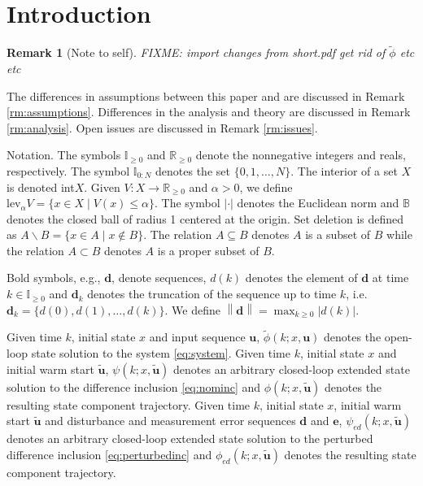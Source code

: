 \documentclass{article}
\newtheorem{remark}{Remark}
\newcommand{\abs}[1]{\left\lvert #1 \right\rvert}
\newcommand{\norm}[1]{\left\lVert #1 \right\rVert}
\begin{document}
\section{Introduction}
\begin{remark}[Note to self]
FIXME: import changes from short.pdf
get rid of $\tilde{\phi}$ etc etc
\end{remark}
\begin{comment}
words words words \\ FIMXE
I did a brief literature search and the results here all appear to be novel
but I will need to do a more in depth search FIXME. \\
\\
\end{comment}
The differences in assumptions between this paper and \cite{pannocchia:rawlings:wright:2011}
are discussed in Remark \ref{rm:assumptions}. Differences in the analysis and theory are discussed
in Remark \ref{rm:analysis}. Open issues are discussed in Remark \ref{rm:issues}. 

Notation. The symbols $\mathbb{I}_{\geq 0}$ and $\mathbb{R}_{\geq 0}$ denote
the nonnegative integers and reals, respectively. The symbol $\mathbb{I}_{
0:N}$ denotes the set $\{0,1,\dots,N\}$. The interior of a set $X$ is
denoted int$X$. Given $V:X\rightarrow\mathbb{R}_{\geq 0}$ and $\alpha > 0$,
we define $\text{lev}_\alpha V = \{x \in X \mid V(x) \leq \alpha\}$.
The symbol $\abs{\cdot}$ denotes the Euclidean norm and 
$\mathbb{B}$ denotes the closed ball of radius 1 centered at the origin.
Set deletion is defined as $A \backslash B = \{x \in A \mid x \notin B\}$. 
The relation $A \subseteq B$ denotes $A$ is a subset of $B$ while the 
relation $A \subset B$ denotes $A$ is a proper subset of $B$. 

Bold symbols, e.g., $\mathbf{d}$, denote sequences, $d(k)$ denotes the element of $\mathbf{d}$ at time 
$k \in \mathbb{I}_{\geq{0}}$ and 
$\mathbf{d}_k$ denotes the truncation of the sequence up to time $k$, i.e.
$\mathbf{d}_k = \{d(0),d(1),\dots,d(k)\}$.
We define $\norm{\mathbf{d}} = \max_{k \geq 0}\abs{d(k)}$. 

Given time $k$, initial state $x$ and input sequence $\mathbf{u}$, $\tilde{\phi}(k;x,\mathbf{u})$ denotes 
the open-loop state solution to the system \eqref{eq:system}.
Given time $k$, initial state $x$ and initial warm start $\tilde{\mathbf{u}}$, $\psi(k;x,\tilde{\mathbf{u}})$ denotes 
an arbitrary closed-loop extended state solution
to the difference inclusion \eqref{eq:nominc}
and $\phi(k;x,\tilde{\mathbf{u}})$ denotes the resulting state component trajectory. 
Given time $k$, initial state $x$, initial warm start $\tilde{\mathbf{u}}$ and disturbance and measurement
error sequences $\mathbf{d}$ and $\mathbf{e}$, $\psi_{ed}(k;x,\tilde{\mathbf{u}})$ denotes 
an arbitrary closed-loop extended state solution
to the perturbed difference inclusion \eqref{eq:perturbedinc}
and $\phi_{ed}(k;x,\tilde{\mathbf{u}})$ denotes the resulting state component trajectory. 
\end{document}
